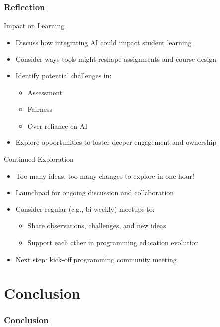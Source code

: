 \documentclass[xcolor=dvipsnames, aspectratio=169]{beamer}
\begin{document}
\section{Reflection}

\begin{frame}{Impact on Learning}
  \begin{itemize}
    \item Discuss how integrating AI could impact student learning
    \item Consider ways tools might reshape assignments and course design
    \item Identify potential challenges in:
      \begin{itemize}
        \item Assessment
        \item Fairness
        \item Over-reliance on AI
      \end{itemize}
    \item Explore opportunities to foster deeper engagement and ownership
  \end{itemize}
\end{frame}

\begin{frame}{Continued Exploration}
  \begin{itemize}
    \item Too many ideas, too many changes to explore in one hour!
    \item Launchpad for ongoing discussion and collaboration
    \item Consider regular (e.g., bi-weekly) meetups to:
      \begin{itemize}
        \item Share observations, challenges, and new ideas
        \item Support each other in programming education evolution
      \end{itemize}
    \item Next step: kick-off programming community meeting
  \end{itemize}
\end{frame}

\part[Conclusion]{Conclusion}
\section{Conclusion}
\end{document}

